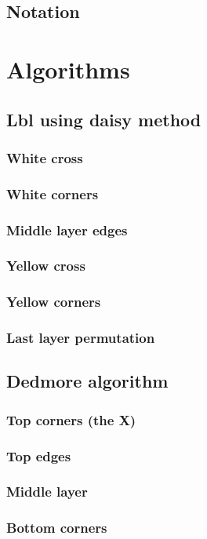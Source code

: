 \documentclass[a4paper,11pt]{kth-mag}
\begin{document}
\subsection{Notation}
\section{Algorithms}
\subsection{Lbl using daisy method}
\subsubsection{White cross}
\subsubsection{White corners}
\subsubsection{Middle layer edges}
\subsubsection{Yellow cross}
\subsubsection{Yellow corners}
\subsubsection{Last layer permutation}
\subsection{Dedmore algorithm}
\subsubsection{Top corners (the X)}
\subsubsection{Top edges}
\subsubsection{Middle layer}
\subsubsection{Bottom corners}
\end{document}
